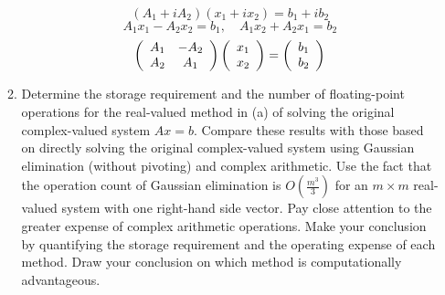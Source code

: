 \documentclass{article}
\begin{document}
\begin{enumerate}
\begin{enumerate}
\[
    (A_1 + i A_2)(x_1 + ix_2) = b_1 + i b_2
\]
\[
    A_1x_1 - A_2x_2 = b_1, \quad A_1x_2 + A_2x_1 = b_2
\]
\[
    \left(\begin{array}{c c}
    A_1 & -A_2 \\
    A_2 & A_1
    \end{array}\right) 
    \left(\begin{array}{c}
    x_1 \\ x_2 \end{array}\right)
    = \left(\begin{array}{c}
    b_1 \\ b_2 \end{array}\right)
\]

\item Determine the storage requirement and the number of floating-point operations for the real-valued method in (a) of solving the original complex-valued system $Ax = b$. Compare these results with those based on directly solving the original complex-valued system using Gaussian elimination (without pivoting) and complex arithmetic. Use the fact that the operation count of Gaussian elimination is $O\left(\frac{m^3}{3}\right)$ for an $m \times m$ real-valued system with one right-hand side vector. Pay close attention to the greater expense of complex arithmetic operations. Make your conclusion by quantifying the storage requirement and the operating expense of each method. Draw your conclusion on which method is computationally advantageous.
\end{enumerate}

\end{enumerate}
\end{document}
